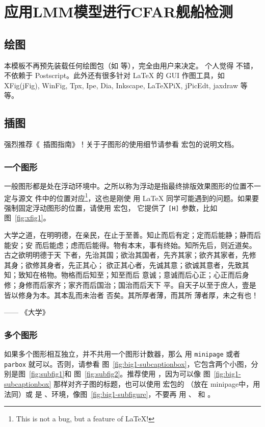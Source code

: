 \section{应用LMM模型进行CFAR舰船检测}

\subsection{绘图}
\label{sec:draw}


本模板不再预先装载任何绘图包（如  等），完全由用户来决定。
个人觉得  不错，不依赖于 Postscript。此外还有很多针对 \LaTeX{} 的
 GUI 作图工具，如 XFig(jFig), WinFig, Tpx, Ipe, Dia, Inkscape, LaTeXPiX,
jPicEdt, jaxdraw 等等。

\subsection{插图}
\label{sec:graphs}

强烈推荐《\LaTeXe\ 插图指南》！关于子图形的使用细节请参看  宏包的说明文档。

\subsubsection{一个图形}
\label{sec:onefig}
一般图形都是处在浮动环境中。之所以称为浮动是指最终排版效果图形的位置不一定与源文
件中的位置对应\footnote{This is not a bug, but a feature of \LaTeX!}，这也是刚使
用 \LaTeX{} 同学可能遇到的问题。如果要强制固定浮动图形的位置，请使用  宏包，
它提供了 \texttt{[H]} 参数，比如图~\ref{fig:xfig1}。


大学之道，在明明德，在亲民，在止于至善。知止而后有定；定而后能静；静而后能安；安
而后能虑；虑而后能得。物有本末，事有终始。知所先后，则近道矣。古之欲明明德于天
下者，先治其国；欲治其国者，先齐其家；欲齐其家者，先修其身；欲修其身者，先正其心；
欲正其心者，先诚其意；欲诚其意者，先致其知；致知在格物。物格而后知至；知至而后
意诚；意诚而后心正；心正而后身 修；身修而后家齐；家齐而后国治；国治而后天下
平。自天子以至于庶人，壹是皆以修身为本。其本乱而未治者 否矣。其所厚者薄，而其所
薄者厚，未之有也！

\hfill —— 《大学》


\subsubsection{多个图形}
\label{sec:multifig}

如果多个图形相互独立，并不共用一个图形计数器，那么
用 \texttt{minipage} 或者\texttt{parbox} 就可以。否则，请参看
图~\ref{fig:big1-subcaptionbox}，它包含两个小图，分别是图~\ref{fig:subfig1}和
图~\ref{fig:subfig2}。推荐使用 ，因为可以像
图~\ref{fig:big1-subcaptionbox} 那样对齐子图的标题，也可以使用 
宏包的 （放在 minipage中，用法同）或
是  、环境，像图~\ref{fig:big1-subfigure}，不要再
用 、 和 。

